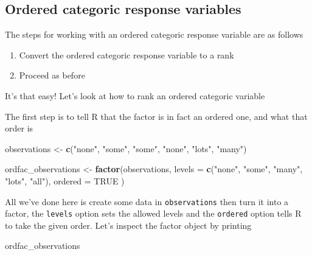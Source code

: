 \documentclass[
]{book}
\newenvironment{Shaded}{\begin{snugshade}}{\end{snugshade}}
\newcommand{\DataTypeTok}[1]{\textcolor[rgb]{0.13,0.29,0.53}{#1}}
\newcommand{\KeywordTok}[1]{\textcolor[rgb]{0.13,0.29,0.53}{\textbf{#1}}}
\newcommand{\NormalTok}[1]{#1}
\newcommand{\OtherTok}[1]{\textcolor[rgb]{0.56,0.35,0.01}{#1}}
\newcommand{\StringTok}[1]{\textcolor[rgb]{0.31,0.60,0.02}{#1}}
\providecommand{\tightlist}{%
  \setlength{\itemsep}{0pt}\setlength{\parskip}{0pt}}
\begin{document}
\hypertarget{ordered-categoric-response-variables}{%
\subsection{Ordered categoric response variables}\label{ordered-categoric-response-variables}}

The steps for working with an ordered categoric response variable are as follows

\begin{enumerate}
\def\labelenumi{\arabic{enumi}.}
\tightlist
\item
  Convert the ordered categoric response variable to a rank
\item
  Proceed as before
\end{enumerate}

It's that easy! Let's look at how to rank an ordered categoric variable

The first step is to tell R that the factor is in fact an ordered one, and what that order is

\begin{Shaded}
\begin{Highlighting}[]
\NormalTok{observations <-}\StringTok{ }\KeywordTok{c}\NormalTok{(}\StringTok{"none"}\NormalTok{, }\StringTok{"some"}\NormalTok{, }\StringTok{"some"}\NormalTok{, }\StringTok{"none"}\NormalTok{, }\StringTok{"lots"}\NormalTok{, }\StringTok{"many"}\NormalTok{)}

\NormalTok{ordfac_observations <-}\StringTok{ }\KeywordTok{factor}\NormalTok{(observations, }
                          \DataTypeTok{levels =} \KeywordTok{c}\NormalTok{(}\StringTok{"none"}\NormalTok{, }\StringTok{"some"}\NormalTok{, }\StringTok{"many"}\NormalTok{, }\StringTok{"lots"}\NormalTok{, }\StringTok{"all"}\NormalTok{),}
                          \DataTypeTok{ordered =} \OtherTok{TRUE}
\NormalTok{                          )}
\end{Highlighting}
\end{Shaded}

All we've done here is create some data in \texttt{observations} then turn it into a factor, the \texttt{levels} option sets the allowed levels and the \texttt{ordered} option tells R to take the given order. Let's inspect the factor object by printing

\begin{Shaded}
\begin{Highlighting}[]
\NormalTok{ordfac_observations}
\end{Highlighting}
\end{Shaded}
\end{document}
